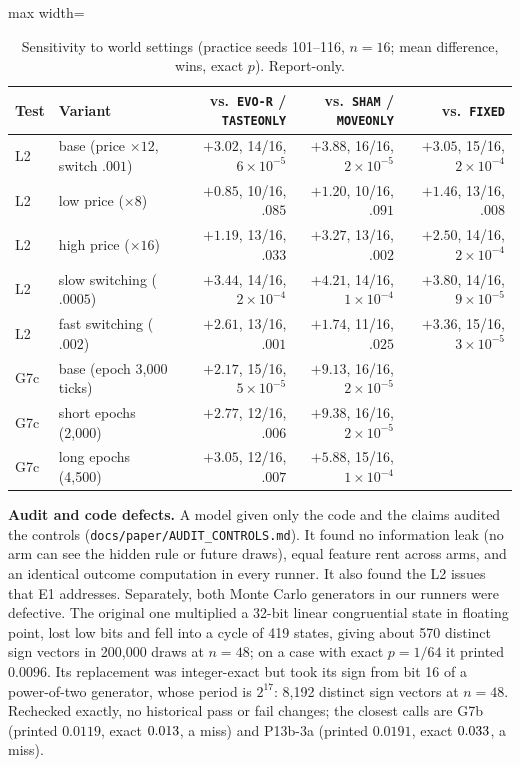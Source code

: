 \documentclass[11pt]{article}
\begin{document}
\begin{table}[t]
\centering
\caption{Sensitivity to world settings (practice seeds 101--116, $n=16$; mean difference, wins, exact $p$). Report-only.}
\label{tab:sensitivity}
\small
\begin{adjustbox}{max width=\textwidth}
\begin{tabular}{@{}llrrr@{}}
\toprule
\textbf{Test} & \textbf{Variant} & \textbf{vs.\ \texttt{EVO-R} / \texttt{TASTEONLY}} & \textbf{vs.\ \texttt{SHAM} / \texttt{MOVEONLY}} & \textbf{vs.\ \texttt{FIXED}} \\
\midrule
L2 & base (price $\times 12$, switch $.001$) & $+3.02$, 14/16, $6\times 10^{-5}$ & $+3.88$, 16/16, $2\times 10^{-5}$ & $+3.05$, 15/16, $2\times 10^{-4}$ \\
L2 & low price ($\times 8$) & $+0.85$, 10/16, $.085$ & $+1.20$, 10/16, $.091$ & $+1.46$, 13/16, $.008$ \\
L2 & high price ($\times 16$) & $+1.19$, 13/16, $.033$ & $+3.27$, 13/16, $.002$ & $+2.50$, 14/16, $2\times 10^{-4}$ \\
L2 & slow switching ($.0005$) & $+3.44$, 14/16, $2\times 10^{-4}$ & $+4.21$, 14/16, $1\times 10^{-4}$ & $+3.80$, 14/16, $9\times 10^{-5}$ \\
L2 & fast switching ($.002$) & $+2.61$, 13/16, $.001$ & $+1.74$, 11/16, $.025$ & $+3.36$, 15/16, $3\times 10^{-5}$ \\
\midrule
G7c & base (epoch 3,000 ticks) & $+2.17$, 15/16, $5\times 10^{-5}$ & $+9.13$, 16/16, $2\times 10^{-5}$ & \\
G7c & short epochs (2,000) & $+2.77$, 12/16, $.006$ & $+9.38$, 16/16, $2\times 10^{-5}$ & \\
G7c & long epochs (4,500) & $+3.05$, 12/16, $.007$ & $+5.88$, 15/16, $1\times 10^{-4}$ & \\
\bottomrule
\end{tabular}
\end{adjustbox}
\end{table}

\textbf{Audit and code defects.} A model given only the code and the claims audited the controls (\texttt{docs/paper/AUDIT\_CONTROLS.md}). It found no information leak (no arm can see the hidden rule or future draws), equal feature rent across arms, and an identical outcome computation in every runner. It also found the L2 issues that E1 addresses. Separately, both Monte Carlo generators in our runners were defective. The original one multiplied a 32-bit linear congruential state in floating point, lost low bits and fell into a cycle of 419 states, giving about 570 distinct sign vectors in 200,000 draws at $n=48$; on a case with exact $p=1/64$ it printed $0.0096$. Its replacement was integer-exact but took its sign from bit 16 of a power-of-two generator, whose period is $2^{17}$: 8,192 distinct sign vectors at $n=48$. Rechecked exactly, no historical pass or fail changes; the closest calls are G7b (printed $0.0119$, exact $0.013$, a miss) and P13b-3a (printed $0.0191$, exact $0.033$, a miss).
\end{document}
